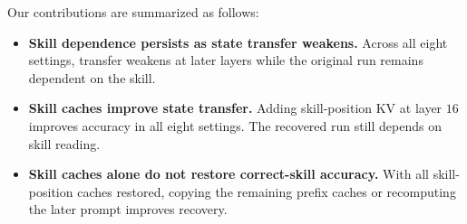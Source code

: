 Our contributions are summarized as follows:
\begin{itemize}
\item \textbf{Skill dependence persists as state transfer weakens.}
Across all eight settings, transfer weakens at later layers while the
original run remains dependent on the skill.
\item \textbf{Skill caches improve state transfer.}
Adding skill-position KV at layer $16$ improves accuracy in all eight
settings. The recovered run still depends on skill reading.
\item \textbf{Skill caches alone do not restore correct-skill accuracy.}
With all skill-position caches restored, copying the remaining prefix
caches or recomputing the later prompt improves recovery.
\end{itemize}
